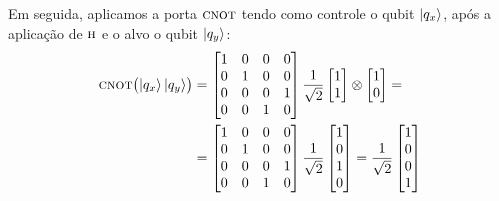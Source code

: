Em seguida, aplicamos a porta \(\operatorname{\textsc{cnot}}\) tendo como controle o qubit $\ket{q_x}$, após a aplicação de \(\operatorname{\textsc{h}}\) e o alvo o qubit $\ket{q_y}$:
\begin{equation}\label{eq:matrizbell00}
	\begin{split}
 		\CNOT \bigl( \ket{q_x}\ket{q_y} \bigr) &=
		\begin{bmatrix}
		1 & 0 & 0 & 0 \\
		0 & 1 & 0 & 0 \\
		0 & 0 & 0 & 1 \\
		0 & 0 & 1 & 0
		\end{bmatrix}
		\frac{1}{\sqrt{2}} \begin{bmatrix*}[r]
		1 \\
		1
		\end{bmatrix*} \otimes  \begin{bmatrix*}[r]
		1 \\
		0
		\end{bmatrix*} = \\
		&= \begin{bmatrix}
		1 & 0 & 0 & 0 \\
		0 & 1 & 0 & 0 \\
		0 & 0 & 0 & 1 \\
		0 & 0 & 1 & 0
		\end{bmatrix} \frac{1}{\sqrt{2}}\begin{bmatrix}
		1 \\
		0 \\
		1 \\
		0
		\end{bmatrix} = \frac{1}{\sqrt{2}} \begin{bmatrix}
		1 \\
		0 \\
		0 \\
		1
		\end{bmatrix}
	\end{split}	
\end{equation}

